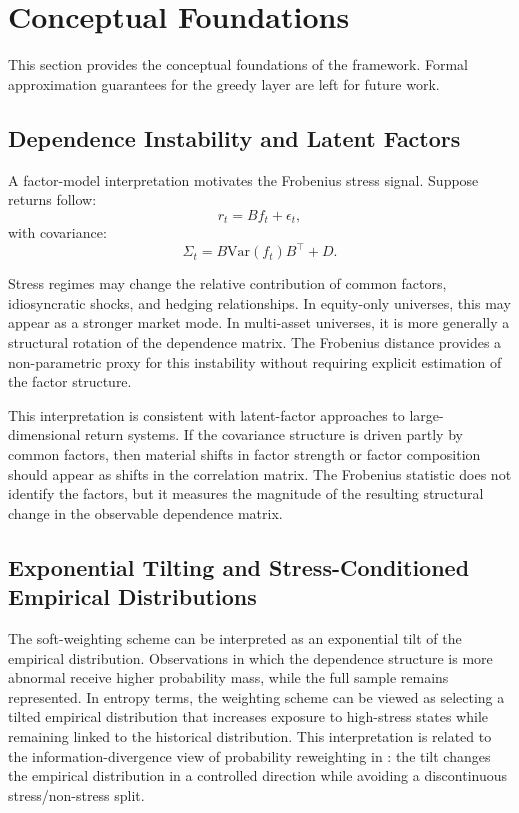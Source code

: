 \documentclass[11pt]{article}
\begin{document}
\section{Conceptual Foundations}
\label{sec:theoretical_motivation}

This section provides the conceptual foundations of the framework. Formal approximation guarantees for the greedy layer are left for future work.

\subsection{Dependence Instability and Latent Factors}

A factor-model interpretation motivates the Frobenius stress signal. Suppose returns follow:
\begin{equation}
r_t = B f_t + \epsilon_t,
\end{equation}
with covariance:
\begin{equation}
\Sigma_t = B \mathrm{Var}(f_t) B^\top + D.
\end{equation}

Stress regimes may change the relative contribution of common factors, idiosyncratic shocks, and hedging relationships. In equity-only universes, this may appear as a stronger market mode. In multi-asset universes, it is more generally a structural rotation of the dependence matrix. The Frobenius distance provides a non-parametric proxy for this instability without requiring explicit estimation of the factor structure.

This interpretation is consistent with latent-factor approaches to large-dimensional return systems. If the covariance structure is driven partly by common factors, then material shifts in factor strength or factor composition should appear as shifts in the correlation matrix. The Frobenius statistic does not identify the factors, but it measures the magnitude of the resulting structural change in the observable dependence matrix.

\subsection{Exponential Tilting and Stress-Conditioned Empirical Distributions}

The soft-weighting scheme can be interpreted as an exponential tilt of the empirical distribution. Observations in which the dependence structure is more abnormal receive higher probability mass, while the full sample remains represented. In entropy terms, the weighting scheme can be viewed as selecting a tilted empirical distribution that increases exposure to high-stress states while remaining linked to the historical distribution. This interpretation is related to the information-divergence view of probability reweighting in \citet{csiszar1975}: the tilt changes the empirical distribution in a controlled direction while avoiding a discontinuous stress/non-stress split.
\end{document}
